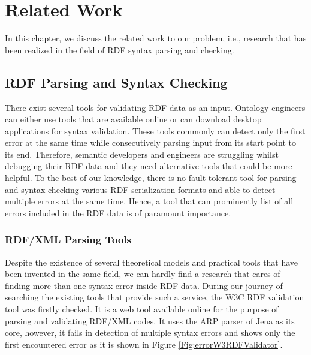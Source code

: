 \chapter{Related Work}
\label{ch:related}


In this chapter, we discuss the related work to our problem, i.e., research that has been realized in the field of RDF syntax parsing and checking.

\section{RDF Parsing and Syntax Checking}

There exist several tools for validating RDF data as an input.
Ontology engineers can either use tools that are available online or can download desktop applications for syntax validation.
These tools commonly can detect only the first error at the same time while consecutively parsing input from its start point to its end. 
Therefore, semantic developers and engineers are struggling whilst debugging their RDF data and they need alternative tools that could be more helpful. 
To the best of our knowledge, there is no fault-tolerant tool for parsing and syntax checking various RDF serialization formats and able to detect multiple errors at the same time.  
Hence, a tool that can prominently list of all errors included in the RDF data is of paramount importance.

\subsection{RDF/XML Parsing Tools}

Despite the existence of several theoretical models and practical tools that have been invented in the same field, we can hardly find a research that cares of finding more than one syntax error inside RDF data. 
During our journey of searching the existing tools that provide such a service, the W3C RDF validation tool \cite{W3C:Validation:Online} was firstly checked.
It is a web tool available online for the purpose of parsing and validating RDF/XML codes. 
It uses the ARP parser of Jena \cite{McBride:2002:JSW:613357.613755} as its core, however, it fails in detection of multiple syntax errors and shows only the first encountered error as it is shown in Figure \ref{Fig:errorW3RDFValidator}.
 
